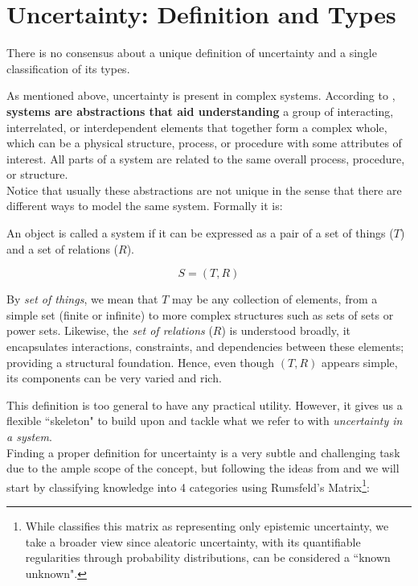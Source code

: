 \section{Uncertainty: Definition and Types}

There is no consensus about a unique definition of uncertainty and a single classification of its types. 

As mentioned above, uncertainty is present in complex systems. According to \cite{UncertaintySciences}, \textbf{systems are abstractions that aid understanding} a group of interacting, interrelated, or interdependent elements that together form a complex whole, which can be a physical structure, process, or procedure with some attributes of interest. All parts of a system are related to the same overall process, procedure, or structure. \\

Notice that usually these abstractions are not unique in the sense that there are different ways to model the same system. Formally it is:

\begin{definition}[System]
    An object is called a system if it can be expressed as a pair of a set of things ($T$) and a set of relations ($R$).

    \[S = (T,R)\]
\end{definition}

\begin{remark}
    By \emph{set of things}, we mean that \(T\) may be any collection of elements, from a simple set (finite or infinite) to more complex structures such as sets of sets or power sets. Likewise, the \emph{set of relations} (\(R\)) is understood broadly, it encapsulates interactions, constraints, and dependencies between these elements; providing a structural foundation. Hence, even though \((T, R)\) appears simple, its components can be very varied and rich.
\end{remark}

This definition is too general to have any practical utility. However, it gives us a flexible ``skeleton" to build upon and tackle what we refer to with \textit{uncertainty in a system}. \\

Finding a proper definition for uncertainty is a very subtle and challenging task due to the ample scope of the concept, but following the ideas from \cite{UncertaintySciences} and \cite{RumsfeldMatrix} we will start by classifying knowledge into 4 categories using Rumsfeld's Matrix\footnote{While \cite{RumsfeldMatrix} classifies this matrix as representing only epistemic uncertainty, we take a broader view since aleatoric uncertainty, with its quantifiable regularities through probability distributions, can be considered a ``known unknown".}:

